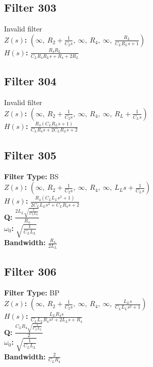 \documentclass{article}
\begin{document}
\subsection*{Filter 303}
Invalid filter \\ 
\textbf{$Z(s)$:} $\left( \infty, \  R_{2} + \frac{1}{C_{2} s}, \  \infty, \  R_{4}, \  \infty, \  \frac{R_{L}}{C_{L} R_{L} s + 1}\right)$ \\ 
\textbf{$H(s)$:} $\frac{R_{4} R_{L}}{C_{L} R_{4} R_{L} s + R_{4} + 2 R_{L}}$ \\ 
\subsection*{Filter 304}
Invalid filter \\ 
\textbf{$Z(s)$:} $\left( \infty, \  R_{2} + \frac{1}{C_{2} s}, \  \infty, \  R_{4}, \  \infty, \  R_{L} + \frac{1}{C_{L} s}\right)$ \\ 
\textbf{$H(s)$:} $\frac{R_{4} \left(C_{L} R_{L} s + 1\right)}{C_{L} R_{4} s + 2 C_{L} R_{L} s + 2}$ \\ 
\subsection*{Filter 305}
\textbf{Filter Type:} BS \\ 
\textbf{$Z(s)$:} $\left( \infty, \  R_{2} + \frac{1}{C_{2} s}, \  \infty, \  R_{4}, \  \infty, \  L_{L} s + \frac{1}{C_{L} s}\right)$ \\ 
\textbf{$H(s)$:} $\frac{R_{4} \left(C_{L} L_{L} s^{2} + 1\right)}{2 C_{L} L_{L} s^{2} + C_{L} R_{4} s + 2}$ \\ 
\textbf{Q:} $\frac{2 L_{L} \sqrt{\frac{1}{C_{L} L_{L}}}}{R_{4}}$ \\ 
\textbf{$\omega_0$:} $\sqrt{\frac{1}{C_{L} L_{L}}}$ \\ 
\textbf{Bandwidth:} $\frac{R_{4}}{2 L_{L}}$ \\ 
\subsection*{Filter 306}
\textbf{Filter Type:} BP \\ 
\textbf{$Z(s)$:} $\left( \infty, \  R_{2} + \frac{1}{C_{2} s}, \  \infty, \  R_{4}, \  \infty, \  \frac{L_{L} s}{C_{L} L_{L} s^{2} + 1}\right)$ \\ 
\textbf{$H(s)$:} $\frac{L_{L} R_{4} s}{C_{L} L_{L} R_{4} s^{2} + 2 L_{L} s + R_{4}}$ \\ 
\textbf{Q:} $\frac{C_{L} R_{4} \sqrt{\frac{1}{C_{L} L_{L}}}}{2}$ \\ 
\textbf{$\omega_0$:} $\sqrt{\frac{1}{C_{L} L_{L}}}$ \\ 
\textbf{Bandwidth:} $\frac{2}{C_{L} R_{4}}$ \\ 
\end{document}
